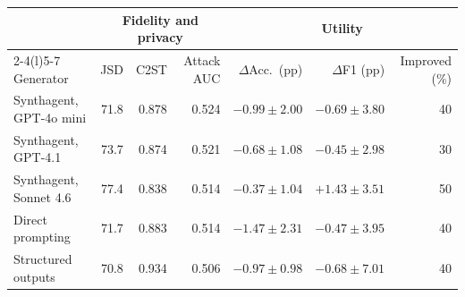 \documentclass[conference]{IEEEtran}
\newcommand{\best}[1]{\textbf{\boldmath #1}} %
\providecommand{\DIFaddbeginFL}{} %
\providecommand{\DIFdelendFL}{} %
\newcommand{\DIFaddincludegraphics}[2][]{{\color{blue}\fbox{\DIFOincludegraphics[#1]{#2}}}} %
\DeclareRobustCommand{\DIFaddbeginFL}{\DIFOaddbeginFL \let\includegraphics\DIFaddincludegraphics} %
\DeclareRobustCommand{\DIFdelendFL}{\DIFOaddendFL \let\includegraphics\DIFOincludegraphics} %
\begin{document}
\begin{table}[t]
\DIFdelendFL \DIFaddbeginFL \begin{tabular*}{\textwidth}{@{\extracolsep{\fill}}lrrrrrr@{}}
\toprule
& \multicolumn{3}{c}{Fidelity and privacy} & \multicolumn{3}{c}{Utility} \\
\cmidrule(lr){2-4}\cmidrule(l){5-7}
Generator & JSD & C2ST & Attack AUC & $\Delta$Acc.\ (pp) & $\Delta$F1 (pp) & Improved (\%) \\
\midrule
Synthagent, GPT-4o mini & 71.8 & 0.878 & 0.524 & $-0.99\pm2.00$ & $-0.69\pm3.80$ & 40 \\
Synthagent, GPT-4.1 & 73.7 & 0.874 & 0.521 & $-0.68\pm1.08$ & $-0.45\pm2.98$ & 30 \\
Synthagent, Sonnet 4.6 & 77.4 & 0.838 & 0.514 & $-0.37\pm1.04$ & \best{$+1.43\pm3.51$} & 50 \\
Direct prompting & 71.7 & 0.883 & 0.514 & $-1.47\pm2.31$ & $-0.47\pm3.95$ & 40 \\
Structured outputs & 70.8 & 0.934 & 0.506 & $-0.97\pm0.98$ & $-0.68\pm7.01$ & 40 \\

\end{tabular*}
\end{table}
\end{document}
